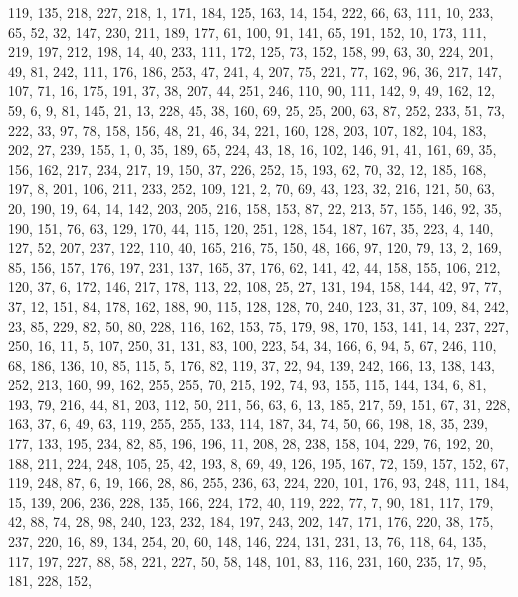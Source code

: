 \begin{DoxyCode}
       119, 135, 218, 227, 218, 1, 171, 184, 125, 163, 14, 154, 222, 66, 63, 111, 10, 233, 65, 52, 32, 147, 230,
       211, 189, 177, 61, 100, 91, 141, 65, 191, 152, 10, 173, 111, 219, 197, 212, 198, 14, 40, 233, 111, 172, 125,
       73, 152, 158, 99, 63, 30, 224, 201, 49, 81, 242, 111, 176, 186, 253, 47, 241, 4, 207, 75, 221, 77, 162, 96,
       36, 217, 147, 107, 71, 16, 175, 191, 37, 38, 207, 44, 251, 246, 110, 90, 111, 142, 9, 49, 162, 12, 59, 6, 9,
       81, 145, 21, 13, 228, 45, 38, 160, 69, 25, 25, 200, 63, 87, 252, 233, 51, 73, 222, 33, 97, 78, 158, 156, 48,
       21, 46, 34, 221, 160, 128, 203, 107, 182, 104, 183, 202, 27, 239, 155, 1, 0, 35, 189, 65, 224, 43, 18, 16,
       102, 146, 91, 41, 161, 69, 35, 156, 162, 217, 234, 217, 19, 150, 37, 226, 252, 15, 193, 62, 70, 32, 12, 185,
       168, 197, 8, 201, 106, 211, 233, 252, 109, 121, 2, 70, 69, 43, 123, 32, 216, 121, 50, 63, 20, 190, 19, 64,
       14, 142, 203, 205, 216, 158, 153, 87, 22, 213, 57, 155, 146, 92, 35, 190, 151, 76, 63, 129, 170, 44, 115,
       120, 251, 128, 154, 187, 167, 35, 223, 4, 140, 127, 52, 207, 237, 122, 110, 40, 165, 216, 75, 150, 48, 166,
       97, 120, 79, 13, 2, 169, 85, 156, 157, 176, 197, 231, 137, 165, 37, 176, 62, 141, 42, 44, 158, 155, 106, 212,
       120, 37, 6, 172, 146, 217, 178, 113, 22, 108, 25, 27, 131, 194, 158, 144, 42, 97, 77, 37, 12, 151, 84, 178,
       162, 188, 90, 115, 128, 128, 70, 240, 123, 31, 37, 109, 84, 242, 23, 85, 229, 82, 50, 80, 228, 116, 162,
       153, 75, 179, 98, 170, 153, 141, 14, 237, 227, 250, 16, 11, 5, 107, 250, 31, 131, 83, 100, 223, 54, 34, 166, 6,
       94, 5, 67, 246, 110, 68, 186, 136, 10, 85, 115, 5, 176, 82, 119, 37, 22, 94, 139, 242, 166, 13, 138, 143,
       252, 213, 160, 99, 162, 255, 255, 70, 215, 192, 74, 93, 155, 115, 144, 134, 6, 81, 193, 79, 216, 44, 81, 203,
       112, 50, 211, 56, 63, 6, 13, 185, 217, 59, 151, 67, 31, 228, 163, 37, 6, 49, 63, 119, 255, 255, 133, 114,
       187, 34, 74, 50, 66, 198, 18, 35, 239, 177, 133, 195, 234, 82, 85, 196, 196, 11, 208, 28, 238, 158, 104, 229,
       76, 192, 20, 188, 211, 224, 248, 105, 25, 42, 193, 8, 69, 49, 126, 195, 167, 72, 159, 157, 152, 67, 119,
       248, 87, 6, 19, 166, 28, 86, 255, 236, 63, 224, 220, 101, 176, 93, 248, 111, 184, 15, 139, 206, 236, 228, 135,
       166, 224, 172, 40, 119, 222, 77, 7, 90, 181, 117, 179, 42, 88, 74, 28, 98, 240, 123, 232, 184, 197, 243,
       202, 147, 171, 176, 220, 38, 175, 237, 220, 16, 89, 134, 254, 20, 60, 148, 146, 224, 131, 231, 13, 76, 118,
       64, 135, 117, 197, 227, 88, 58, 221, 227, 50, 58, 148, 101, 83, 116, 231, 160, 235, 17, 95, 181, 228, 152,

\end{DoxyCode}
